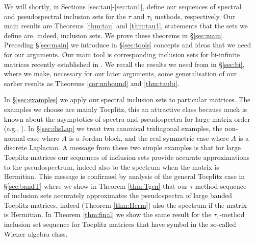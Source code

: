 \documentclass[preprint,1p,11pt]{elsarticle}
\numberwithin{equation}{section}   %
\numberwithin{figure}{section}  %
\begin{document}
We will shortly, in Sections \ref{sec:tau}-\ref{sec:tau1}, define our sequences of spectral and pseudospectral inclusion sets for the $\tau$ and $\tau_1$ methods, respectively. Our main results are Theorems \ref{thm:tau} and \ref{thm:tau1}, statements that the sets we define are, indeed, inclusion sets. We prove these theorems in \S\ref{sec:main}. Preceding \S\ref{sec:main} we introduce in \S\ref{sec:tools} concepts  and ideas that we need for our arguments. Our main tool is corresponding inclusion sets for bi-infinite matrices  recently established in \cite{CW.Heng.ML:SpecIncl1}. We recall the results we need from \cite{CW.Heng.ML:SpecIncl1} in \S\ref{sec:bi}, where we make, necessary for our later arguments, some generalisation of our earlier results as Theorems \ref{cor:nubound} and \ref{thm:taubi}.

In \S\ref{sec:examples} we apply our spectral inclusion sets to particular matrices. The examples we choose are mainly Toeplitz, this an attractive class because much is known about the asymptotics of spectra and pseudospectra for large matrix order (e.g.,  \cite{ReichelTref,BoeGru,BoeSi2,TrefEmbBook}). In \S\ref{sec:disLap} we treat two canonical tridiagonal examples, the non-normal case where $A$ is a Jordan block, and the real symmetric case where $A$ is a discrete Laplacian. A message from these two simple examples is that for large Toeplitz matrices our sequences of inclusion sets provide accurate approximations to the pseudospectrum, indeed  also to the spectrum when the matrix is Hermitian. This message is confirmed by analysis of the general Toeplitz case in \S\ref{sec:bandT} where we show in Theorem \ref{thm:Tgen} that our $\tau$-method sequence of inclusion sets accurately approximates the pseudospectra of large banded Toeplitz matrices, indeed (Theorem \ref{thm:Herm}) also the spectrum if the matrix is Hermitian. In Theorem  \ref{thm:final} we show the same result for the $\tau_1$-method inclusion set sequence for Toeplitz matrices that %
 have symbol in the so-called Wiener algebra class.
\end{document}
